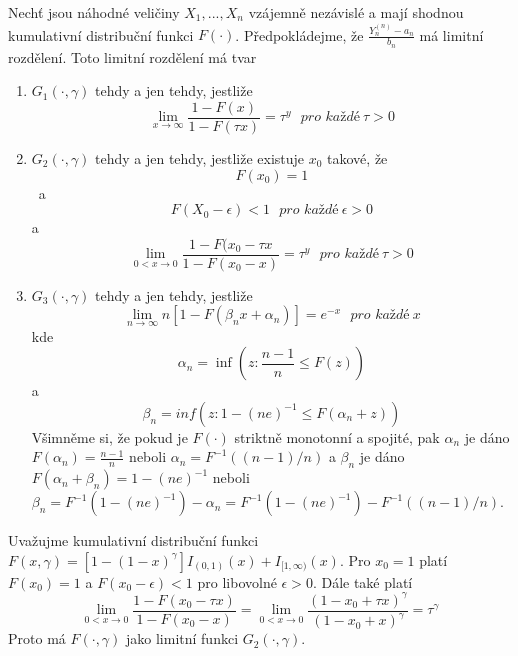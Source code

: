 \begin{theorem}
Nechť jsou náhodné veličiny $X_1, ..., X_n$ vzájemně nezávislé a mají shodnou kumulativní distribuční funkci $F(\cdot)$. Předpokládejme, že $\frac{Y_n^{(n)} - a_n}{b_n}$ má limitní rozdělení. Toto limitní rozdělení má tvar
\begin{enumerate}
\item $G_1(\cdot, \gamma)$ tehdy a jen tehdy, jestliže
\begin{equation*}
\lim_{x \rightarrow \infty} \frac{1 - F(x)}{1 - F(\tau x)} = \tau^y ~~~\textit{pro každé}~ \tau > 0
\end{equation*}
\item $G_2(\cdot, \gamma)$ tehdy a jen tehdy, jestliže existuje $x_0$ takové, že
\begin{equation*}
F(x_0) = 1
\end{equation*}\
a
\begin{equation*}
F(X_0 - \epsilon) < 1 ~~~ \textit{pro každé}~ \epsilon > 0
\end{equation*}
a
\begin{equation*}
\lim_{0 < x \rightarrow 0} \frac{1 - F(x_0 - \tau x}{1 - F(x_0 - x)} = \tau^y ~~~ \textit{pro každé}~ \tau > 0
\end{equation*}
\item $G_3(\cdot, \gamma)$ tehdy a jen tehdy, jestliže
\begin{equation*}
\lim_{n \rightarrow \infty} n[1 - F(\beta_nx + \alpha_n)] = e^{-x} ~~~ \textit{pro každé} ~ x
\end{equation*}
kde
\begin{equation*}
\alpha_n = \inf \left(z: \frac{n - 1}{n} \le F(z) \right)
\end{equation*}
a
\begin{equation*}
\beta_n = inf\left(z: 1 - (ne)^{-1} \le F(\alpha_n + z) \right)
\end{equation*}
Všimněme si, že pokud je $F(\cdot)$ striktně monotonní a spojité, pak $\alpha_n$ je dáno $F(\alpha_n) = \frac{n - 1}{n}$ neboli $\alpha_n = F^{-1}\left((n - 1)/n \right)$ a $\beta_n$ je dáno $F(\alpha_n + \beta_n) = 1 - (ne)^{-1}$ neboli $\beta_n = F^{-1}\left(1 - (ne)^{-1} \right) - \alpha_n = F^{-1}\left(1 - (ne)^{-1} \right) - F^{-1}\left( (n - 1) / n \right)$.
\end{enumerate}
\end{theorem}

\begin{example}
Uvažujme kumulativní distribuční funkci $F(x, \gamma) = [1 - (1 - x)^{\gamma}]I_{(0,1)}(x) + I_{[1, \infty)}(x)$. Pro $x_0 = 1$ platí $F(x_0) = 1$ a $F(x_0 - \epsilon) < 1$ pro libovolné $\epsilon > 0$. Dále také platí
\begin{equation*}
\lim_{0 < x \rightarrow 0} \frac{1 - F(x_0 - \tau x)}{1 - F(x_0 - x)} = \lim_{0 < x \rightarrow 0} \frac{(1 - x_0 + \tau x)^{\gamma}}{(1 - x_0 + x)^{\gamma}} = \tau^{\gamma}
\end{equation*}
Proto má $F(\cdot, \gamma)$ jako limitní funkci $G_2(\cdot, \gamma)$.
\end{example}

